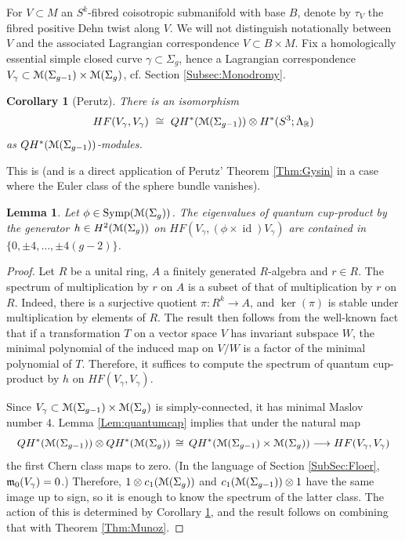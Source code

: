 \documentclass[reqno,10pt]{amsart}
\numberwithin{equation}{section}
\newcommand{\bR}{{\mathbb R}}
\newcommand{\scrM}{\EuScript{M}}
\newcommand{\id}{\operatorname{id}}
\newcommand{\Symp}{\operatorname{Symp}}
\newtheorem{Corollary}[thm]{Corollary}
\newtheorem{Lemma}[thm]{Lemma}
\theoremstyle{remark}
\begin{document}
For $V\subset M$ an $S^k$-fibred coisotropic submanifold with base $B$, denote by $\tau_V$ the fibred positive Dehn twist along $V$. We will not distinguish notationally between $V$ and the associated Lagrangian correspondence $V\subset B\times M$.  
Fix a homologically essential simple closed curve $\gamma \subset \Sigma_g$, hence a Lagrangian correspondence $V_{\gamma} \subset \scrM(\Sigma_{g-1}) \times \scrM(\Sigma_g)$, cf. Section \ref{Subsec:Monodromy}.

\begin{Corollary}[Perutz] \label{Cor:P}
There is an isomorphism 
\[
HF(V_{\gamma}, V_{\gamma}) \ \cong \ QH^*(\scrM(\Sigma_{g-1})) \otimes H^*(S^3;\Lambda_{\bR})
\]
as $QH^*(\scrM(\Sigma_{g-1}))$-modules.
\end{Corollary}

This is  \cite[Theorem 7.5]{Perutz}  (and is a direct application of Perutz' Theorem \ref{Thm:Gysin} in a case where the Euler class of the sphere bundle vanishes). 

\begin{Lemma} \label{Lem:Evals}
Let $\phi \in \Symp(\scrM(\Sigma_g))$. The eigenvalues of quantum cup-product by the generator $h\in H^2(\scrM(\Sigma_g))$ on $HF(V_{\gamma}, (\phi\times\id)V_{\gamma})$ are contained in  $\{0, \pm 4, \ldots, \pm 4(g-2)\}$. 
\end{Lemma}

\begin{proof}
Let $R$ be a unital ring, $A$ a finitely generated $R$-algebra and $r\in R$. The spectrum of multiplication by $r$ on $A$ is a subset of that of multiplication by $r$ on $R$. Indeed, there is a surjective quotient $\pi:R^k \rightarrow A$, and $\ker(\pi)$ is stable under multiplication by elements of $R$. The result then follows from the well-known fact that if a transformation $T$ on a vector space $V$ has invariant subspace $W$, the minimal polynomial of the induced map on $V/W$ is a factor of the minimal polynomial of $T$. Therefore, it suffices to compute the spectrum of quantum cup-product by $h$ on $HF(V_{\gamma}, V_{\gamma})$.

Since $V_{\gamma} \subset \scrM(\Sigma_{g-1}) \times \scrM(\Sigma_{g})$ is simply-connected, it has minimal Maslov number $4$.  Lemma \ref{Lem:quantumcap} implies that under the natural map
\[
QH^*(\scrM(\Sigma_{g-1})) \otimes QH^*(\scrM(\Sigma_{g})) \, \cong \, QH^*(\scrM(\Sigma_{g-1}) \times \scrM(\Sigma_{g})) \longrightarrow HF(V_{\gamma}, V_{\gamma})
\]
the first Chern class maps to zero.  (In the language of Section \ref{SubSec:Floer}, $\frak{m}_0(V_{\gamma}) = 0$.)   Therefore, $1 \otimes c_1(\scrM(\Sigma_{g}))$ and $c_1(\scrM(\Sigma_{g-1})) \otimes 1$ have the same image up to sign, so it is enough to know the spectrum of the latter class. The action of this is determined by Corollary \ref{Cor:P}, and the result follows on combining that with Theorem \ref{Thm:Munoz}.
\end{proof}
\end{document}
